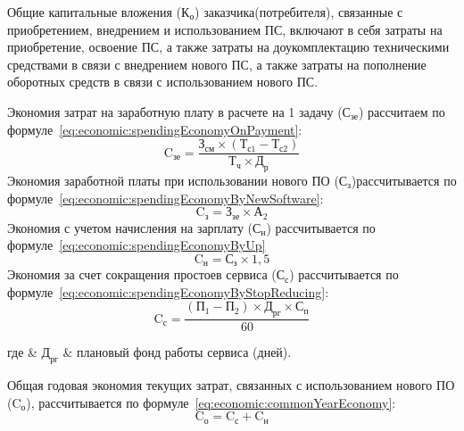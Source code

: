Общие капитальные вложения ($ \text{К}_{\text{о}} $) заказчика(потребителя), связанные с приобретением, внедрением и использованием ПС, включают в себя затраты на приобретение, освоение ПС, а также затраты на доукомплектацию техническими средствами в связи с внедрением нового ПС, а также затраты на пополнение оборотных средств в связи с использованием нового ПС.

Экономия затрат на заработную плату в расчете на 1 задачу ($ \text{С}_{\text{зе}} $) рассчитаем по формуле~\ref{eq:economic:spendingEconomyOnPayment}:
\begin{equation}
  \label{eq:economic:spendingEconomyOnPayment}
  \text{C}_{\text{зе}} =
    \frac { \text{З}_{\text{см}} \times (\text{Т}_{\text{с1}} - \text{Т}_{\text{с2}}) }
          { \text{Т}_{\text{ч}} \times \text{Д}_{\text{р}}}
\end{equation}
Экономия заработной платы при использовании нового ПО ($ \text{С}_{\text{з}} $)рассчитывается по формуле~\ref{eq:economic:spendingEconomyByNewSoftware}:
\begin{equation}
  \label{eq:economic:spendingEconomyByNewSoftware}
  \text{C}_{\text{з}} = { \text{З}_{\text{зе}} \times \text{А}_{\text{2}} }
\end{equation}
Экономия с учетом начисления на зарплату ($ \text{С}_{\text{н}} $) рассчитывается по формуле~\ref{eq:economic:spendingEconomyByUp}
\begin{equation}
  \label{eq:economic:spendingEconomyByUp}
  \text{C}_{\text{н}} = { \text{С}_{\text{з}} \times 1,5 }
\end{equation}
Экономия за счет сокращения простоев сервиса ($ \text{С}_{\text{с}} $) рассчитывается по формуле~\ref{eq:economic:spendingEconomyByStopReducing}:
\begin{equation}
  \label{eq:economic:spendingEconomyByStopReducing}
  \text{C}_{\text{с}} =
    \frac { (\text{П}_{\text{1}} - \text{П}_{\text{2}}) \times \text{Д}_{\text{рг}} \times \text{С}_{\text{п}} }
          { 60 }
\end{equation}
\begin{explanation}
  где & $ \text{Д}_{\text{рг}} $ & плановый фонд работы сервиса (дней).
\end{explanation}

Общая годовая экономия текущих затрат, связанных с использованием нового ПО ($ \text{C}_{\text{о}} $), рассчитывается по формуле~\ref{eq:economic:commonYearEconomy}:
\begin{equation}
  \label{eq:economic:commonYearEconomy}
  \text{C}_{\text{о}} = \text{C}_{\text{с}} + \text{C}_{\text{н}}
\end{equation}

